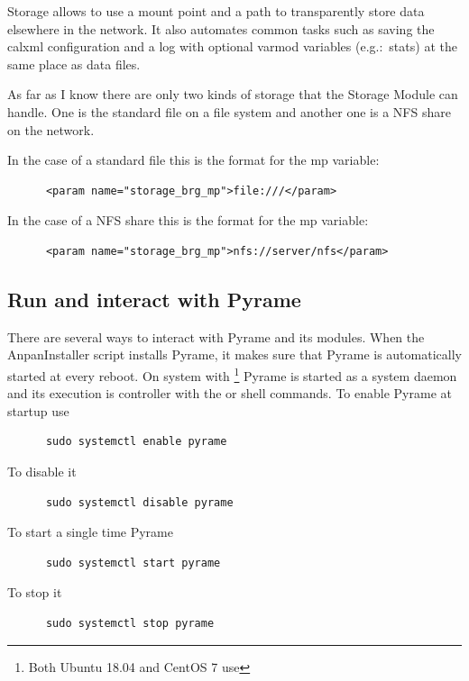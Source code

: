 Storage allows to use a mount point and a path to transparently store
data elsewhere in the network. It also automates common tasks such as
saving the calxml configuration and a log with optional varmod
variables (e.g.:\ stats) at the same place as data files.

As far as I know there are only two kinds of storage that the Storage
Module can handle. One is the standard file on a file system and
another one is a NFS share on the network.

In the case of a standard file this is the format for the mp variable:
\begin{lstlisting}
      <param name="storage_brg_mp">file:///</param>
\end{lstlisting}
In the case of a NFS share this is the format for the mp variable:
\begin{lstlisting}
      <param name="storage_brg_mp">nfs://server/nfs</param>
\end{lstlisting}


\subsection{Run and interact with Pyrame}
There are several ways to interact with Pyrame and its modules. When
the AnpanInstaller script installs Pyrame, it makes sure that Pyrame
is automatically started at every reboot. On system with
\footnote{Both Ubuntu 18.04 and CentOS 7 use
  } Pyrame is started as a system daemon and its
execution is controller with the  or
 shell commands. To enable Pyrame at startup use
\begin{lstlisting}
      sudo systemctl enable pyrame
\end{lstlisting}
To disable it
\begin{lstlisting}
      sudo systemctl disable pyrame
\end{lstlisting}
To start a single time Pyrame
\begin{lstlisting}
      sudo systemctl start pyrame
\end{lstlisting}
To stop it
\begin{lstlisting}
      sudo systemctl stop pyrame
\end{lstlisting}

